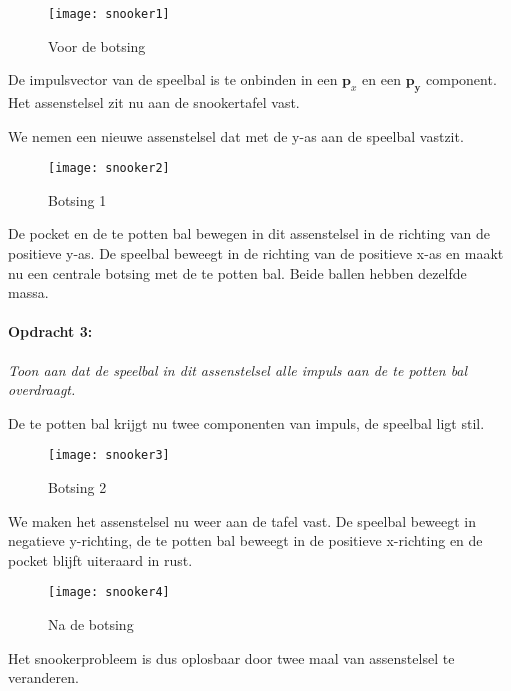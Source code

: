 \begin{figure}[H]
\noindent \begin{centering}
\texttt{[image: snooker1]}
\par\end{centering}

\caption{Voor de botsing}
\end{figure}


De impulsvector van de speelbal is te onbinden in een $\mathbf{p_{\mathrm{\mathit{x}}}}$
en een $\mathbf{p_{y}}$ component. Het assenstelsel zit nu aan de
snookertafel vast. 

We nemen een nieuwe assenstelsel dat met de y-as aan de speelbal vastzit.

\begin{figure}[H]
\noindent \begin{centering}
\texttt{[image: snooker2]}
\par\end{centering}

\caption{Botsing 1}
\end{figure}


De pocket en de te potten bal bewegen in dit assenstelsel in de richting
van de positieve y-as. De speelbal beweegt in de richting van de positieve
x-as en maakt nu een centrale botsing met de te potten bal. Beide
ballen hebben dezelfde massa.

\paragraph*{Opdracht 3:} \emph{Toon aan dat de speelbal in dit assenstelsel alle impuls
aan de te potten bal overdraagt.}

De te potten bal krijgt nu twee componenten van impuls, de speelbal
ligt stil.

\begin{figure}[H]
\noindent \begin{centering}
\texttt{[image: snooker3]}
\par\end{centering}

\caption{Botsing 2}
\end{figure}


We maken het assenstelsel nu weer aan de tafel vast. De speelbal beweegt
in negatieve y-richting, de te potten bal beweegt in de positieve
x-richting en de pocket blijft uiteraard in rust.

\begin{figure}[H]
\noindent \begin{centering}
\texttt{[image: snooker4]}
\par\end{centering}

\caption{Na de botsing}
\end{figure}

Het snookerprobleem is dus oplosbaar door twee maal van assenstelsel
te veranderen.


